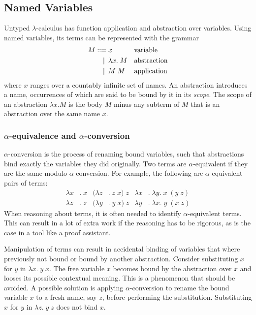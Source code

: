 \documentclass[a4paper,11pt]{article}
\begin{document}
\subsection{Named Variables}

Untyped $\lambda$-calculus has function application and abstraction over
variables. Using named variables, its terms can be represented with the
grammar
\begin{align*}
  M ::=             &\; x
  && \text{variable} \\
  \llap{\textbar\:} &\; \lambda x. \; M
  && \text{abstraction} \\
  \llap{\textbar\:} &\; M \; M
  && \text{application}
\end{align*}
where $x$ ranges over a countably infinite set of names.
An abstraction introduces a name, occurrences of which are said to be
bound by it in its {\em scope}. The scope of an abstraction $\lambda
x.M$ is the body $M$ minus any subterm of $M$ that is an abstraction
over the same name $x$.

\subsubsection*{$\alpha$-equivalence and $\alpha$-conversion}

$\alpha$-conversion is the process of renaming bound variables, such
that abstractions bind exactly the variables they did originally.
Two terms are $\alpha$-equivalent if they are the same modulo
$\alpha$-conversion.
For example, the following are $\alpha$-equivalent pairs of terms:
\begin{align*}
  \lambda x&. \; x & (\lambda z&. \; z \; x) \; z & \lambda x&. \; \lambda y. \; x \; (y \; z)\\
  \lambda z&. \; z & (\lambda y&. \; y \; x) \; z & \lambda y&. \; \lambda x. \; y \; (x \; z)
\end{align*}
When reasoning about terms, it is often needed to identify $\alpha$-equivalent
terms.
This can result in a lot of extra work if the reasoning has to be rigorous,
as is the case in a tool like a proof assistant.

Manipulation of terms can result in accidental binding of variables that
where previously not bound or bound by another abstraction.
Consider substituting $x$ for $y$ in $\lambda x. \; y \; x$.
The free variable $x$ becomes bound by the abstraction over $x$ and looses
its possible contextual meaning.
This is a phenomenon that should be avoided.
A possible solution is applying $\alpha$-conversion to rename the bound
variable $x$ to a fresh name, say $z$, before performing the substitution.
Substituting $x$ for $y$ in $\lambda z. \; y \; z$ does not bind $x$.
\end{document}
